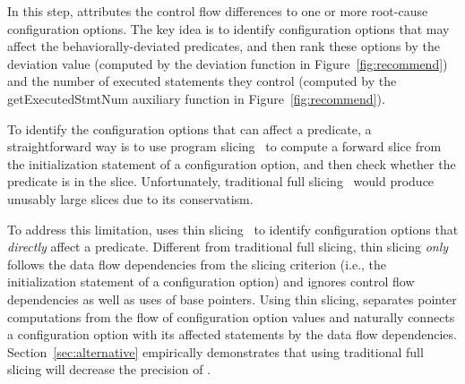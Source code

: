



In this step, \ourtool attributes the control flow differences
to one or more root-cause configuration options.
The key idea is to identify configuration options that
may affect the behaviorally-deviated predicates, and then rank
these options by
the deviation value (computed by the
{deviation} function in Figure~\ref{fig:recommend})
and the number of executed statements they control (computed
by the {get\-ExecutedStmtNum} auxiliary function in Figure~\ref{fig:recommend}).


To identify the configuration options that can affect
a predicate, a straightforward way is to use program slicing~\cite{Weiser:1981}
to compute a forward slice from the initialization statement
of a configuration option, and then check whether the predicate is
in the slice. Unfortunately, traditional
full slicing~\cite{Weiser:1981} would produce
unusably large slices due
to its conservatism. 


To address this limitation, \ourtool uses thin slicing~\cite{Sridharan:2007}
to identify configuration options that \textit{directly} affect
a predicate. Different from traditional full slicing,
thin slicing \textit{only} follows the data flow dependencies
from the slicing criterion (i.e., the initialization statement of a
configuration option) and ignores control flow dependencies
as well as uses of base pointers. Using thin slicing, \ourtool separates
pointer computations from the flow of configuration option
values and naturally connects a configuration option with its
affected statements by the data flow dependencies. Section~\ref{sec:alternative}
empirically demonstrates that using traditional full slicing
will decrease the precision of \ourtool.


